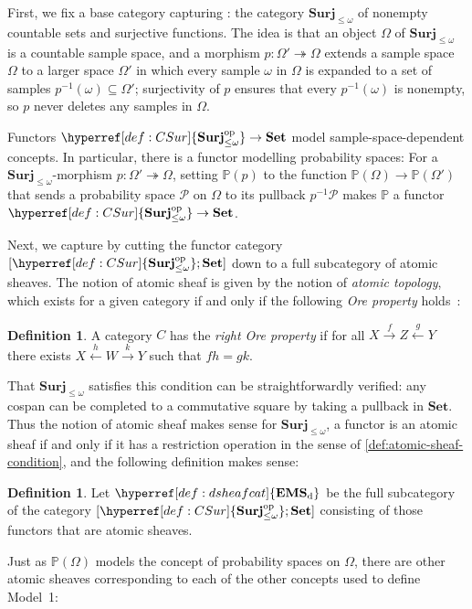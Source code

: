 \documentclass[
  sigconf,
  screen, ]{acmart}
\makeatletter
\theoremstyle{definition}
\newtheorem{definition}[theorem]{Definition}
\newcommand\calP{\mathcal P}
\newcommand{\labelword}[2]{\phantomsection
  #1\def\@currentlabel{\unexpanded{#1}}\label{#2}}
\newcommand\nref[2]{\hyperref[#1]{#2}} \newcommand\checkhigh{{\huge{\color{red}\textbf{TODO: check}}}}
\newcommand\funcat[2]{[#1;#2]}
\newcommand\op{^{\rm op}}
\newcommand\Set{\mathbf{Set}}
\newcommand\goodsheafcat{\mathbf{EMS}}
\newcommand\CSur{{\nref{def:CSur}{\mathbf{Surj}_{\le\omega}}}}
\newcommand\CSurop{{\nref{def:CSur}{\mathbf{Surj}_{\le\omega}\op}}}
\newcommand\discsubscript{_{\rm d}}
\newcommand\Dpspcsprelim{{\nref{def:Dpspcsprelim}{\mathbb{P}}}}
\newcommand\Dpspcs{{\nref{def:Dpspcs}{\mathbb{P}}}}
\newcommand\dsheafcat{{\nref{def:dsheafcat}{\goodsheafcat\discsubscript}}}
\makeatother
\begin{document}
\labelword{First}{def:CSur}, we fix a base category capturing \probExtension{}:
the category $\CSur$ of nonempty countable sets
and surjective functions.
The idea is that an object $\Omega$ of $\CSur$
is a countable sample space,
and a morphism $p : \Omega'\twoheadrightarrow\Omega$
extends a sample space $\Omega$
to a larger space $\Omega'$
in which every sample $\omega$ in $\Omega$
is expanded to a set of samples $p^{-1}(\omega)\subseteq\Omega'$;
surjectivity of $p$ ensures that every $p^{-1}(\omega)$
is nonempty, so $p$ never deletes any samples in $\Omega$.

Functors $\CSurop\to\Set$ model sample-space-dependent concepts.
In particular, there is a functor modelling probability spaces:
  \labelword{For}{def:Dpspcs} a $\CSur$-morphism $p : \Omega'\twoheadrightarrow\Omega$,
  setting $\Dpspcs(p)$ to the function $\Dpspcsprelim(\Omega)\to\Dpspcsprelim(\Omega')$
  that sends a probability space $\calP$
  on $\Omega$ to its pullback $p^{-1}\calP$
  makes $\Dpspcsprelim$ a functor $\CSurop\to\Set$.

Next, we capture \probRestriction{} by cutting the functor category $\funcat{\CSurop}\Set$
down to a full subcategory of atomic sheaves.
The notion of atomic sheaf is given by the notion of \emph{atomic topology},
which exists for a given category if and only if the following \emph{Ore property}
holds~\cite[p.115]{maclane2012sheaves}:
\begin{definition} \label{prop:csur-ore}
  A category $C$ has the \emph{right Ore property}
  if for all $X\xrightarrow f Z\xleftarrow g Y$ there exists
  $X\xleftarrow h W\xrightarrow k Y$ such that $fh = gk$.
\end{definition}
That $\CSur$ satisfies this condition can be straightforwardly verified:
any cospan can be completed to a commutative square
by taking a pullback in $\Set$.
Thus the notion of atomic sheaf makes sense for $\CSur$,
a functor is an atomic sheaf
if and only if it has a restriction operation in the sense of
\cref{def:atomic-sheaf-condition},
and the following definition makes sense:
\begin{definition} \label{def:dsheafcat}
  Let $\dsheafcat$ be the full subcategory of
  the category $\funcat{\CSurop}\Set$
  consisting of those functors that are atomic sheaves.
\end{definition}

Just as $\Dpspcs(\Omega)$ models the concept of probability spaces
on $\Omega$, there are other atomic sheaves corresponding to each
of the other concepts used to define Model~1:
\end{document}
